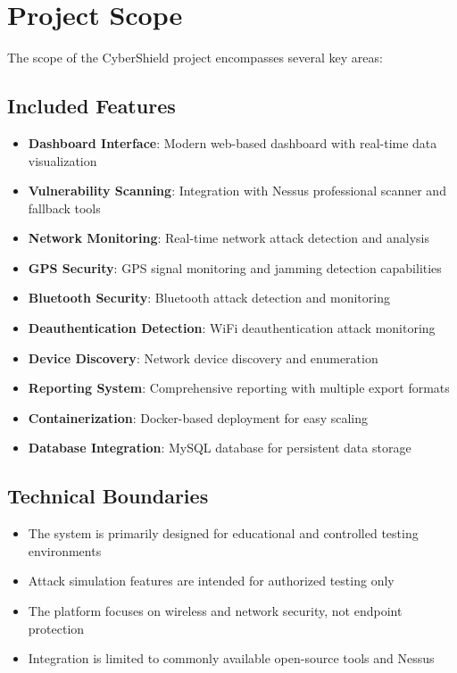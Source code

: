 \documentclass[12pt,a4paper]{report}
\begin{document}
\section{Project Scope}

The scope of the CyberShield project encompasses several key areas:

\subsection{Included Features}
\begin{itemize}
    \item \textbf{Dashboard Interface}: Modern web-based dashboard with real-time data visualization
    \item \textbf{Vulnerability Scanning}: Integration with Nessus professional scanner and fallback tools
    \item \textbf{Network Monitoring}: Real-time network attack detection and analysis
    \item \textbf{GPS Security}: GPS signal monitoring and jamming detection capabilities
    \item \textbf{Bluetooth Security}: Bluetooth attack detection and monitoring
    \item \textbf{Deauthentication Detection}: WiFi deauthentication attack monitoring
    \item \textbf{Device Discovery}: Network device discovery and enumeration
    \item \textbf{Reporting System}: Comprehensive reporting with multiple export formats
    \item \textbf{Containerization}: Docker-based deployment for easy scaling
    \item \textbf{Database Integration}: MySQL database for persistent data storage
\end{itemize}

\subsection{Technical Boundaries}
\begin{itemize}
    \item The system is primarily designed for educational and controlled testing environments
    \item Attack simulation features are intended for authorized testing only
    \item The platform focuses on wireless and network security, not endpoint protection
    \item Integration is limited to commonly available open-source tools and Nessus
\end{itemize}
\end{document}
